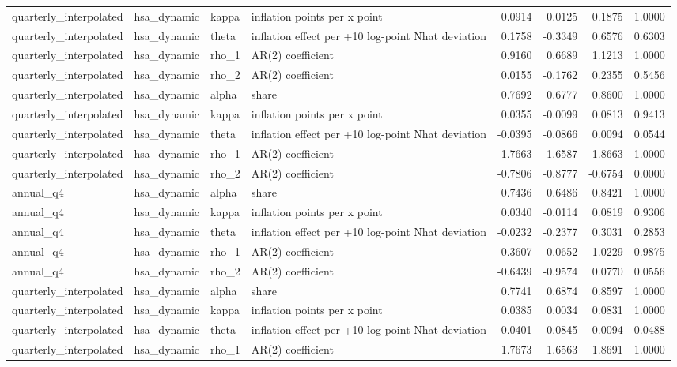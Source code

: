 \begin{tabular}{llllrrrr}
quarterly\_interpolated & hsa\_dynamic & kappa & inflation points per x point & 0.0914 & 0.0125 & 0.1875 & 1.0000 \\
quarterly\_interpolated & hsa\_dynamic & theta & inflation effect per +10 log-point Nhat deviation & 0.1758 & -0.3349 & 0.6576 & 0.6303 \\
quarterly\_interpolated & hsa\_dynamic & rho\_1 & AR(2) coefficient & 0.9160 & 0.6689 & 1.1213 & 1.0000 \\
quarterly\_interpolated & hsa\_dynamic & rho\_2 & AR(2) coefficient & 0.0155 & -0.1762 & 0.2355 & 0.5456 \\
quarterly\_interpolated & hsa\_dynamic & alpha & share & 0.7692 & 0.6777 & 0.8600 & 1.0000 \\
quarterly\_interpolated & hsa\_dynamic & kappa & inflation points per x point & 0.0355 & -0.0099 & 0.0813 & 0.9413 \\
quarterly\_interpolated & hsa\_dynamic & theta & inflation effect per +10 log-point Nhat deviation & -0.0395 & -0.0866 & 0.0094 & 0.0544 \\
quarterly\_interpolated & hsa\_dynamic & rho\_1 & AR(2) coefficient & 1.7663 & 1.6587 & 1.8663 & 1.0000 \\
quarterly\_interpolated & hsa\_dynamic & rho\_2 & AR(2) coefficient & -0.7806 & -0.8777 & -0.6754 & 0.0000 \\
annual\_q4 & hsa\_dynamic & alpha & share & 0.7436 & 0.6486 & 0.8421 & 1.0000 \\
annual\_q4 & hsa\_dynamic & kappa & inflation points per x point & 0.0340 & -0.0114 & 0.0819 & 0.9306 \\
annual\_q4 & hsa\_dynamic & theta & inflation effect per +10 log-point Nhat deviation & -0.0232 & -0.2377 & 0.3031 & 0.2853 \\
annual\_q4 & hsa\_dynamic & rho\_1 & AR(2) coefficient & 0.3607 & 0.0652 & 1.0229 & 0.9875 \\
annual\_q4 & hsa\_dynamic & rho\_2 & AR(2) coefficient & -0.6439 & -0.9574 & 0.0770 & 0.0556 \\
quarterly\_interpolated & hsa\_dynamic & alpha & share & 0.7741 & 0.6874 & 0.8597 & 1.0000 \\
quarterly\_interpolated & hsa\_dynamic & kappa & inflation points per x point & 0.0385 & 0.0034 & 0.0831 & 1.0000 \\
quarterly\_interpolated & hsa\_dynamic & theta & inflation effect per +10 log-point Nhat deviation & -0.0401 & -0.0845 & 0.0094 & 0.0488 \\
quarterly\_interpolated & hsa\_dynamic & rho\_1 & AR(2) coefficient & 1.7673 & 1.6563 & 1.8691 & 1.0000 \\

\end{tabular}
